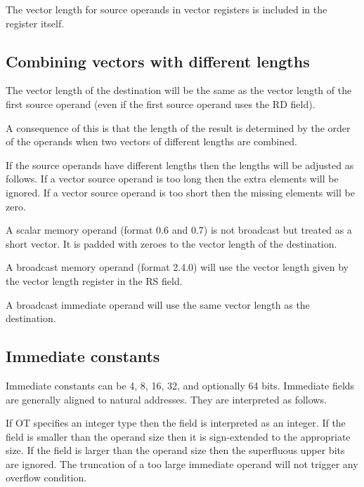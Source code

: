 \documentclass[forwardcom.tex]{subfiles}
\begin{document}
The vector length for source operands in vector registers is included in the register itself.

\subsection{Combining vectors with different lengths}
The vector length of the destination will be the same as the vector length of the first source operand (even if the first source operand uses the RD field).
\vspace{2mm}

A consequence of this is that the length of the result is determined by the order of the operands when two vectors of different lengths are combined.
\vspace{2mm}

If the source operands have different lengths then the lengths will be adjusted as follows. If a vector source operand is too long then the extra elements will be ignored. If a vector source operand is too short then the missing elements will be zero.
\vspace{2mm}

A scalar memory operand (format 0.6 and 0.7) is not broadcast but treated as a short vector. It is padded with zeroes to the vector length of the destination.
\vspace{2mm}

A broadcast memory operand (format 2.4.0) will use the vector length given by the vector length register in the RS field.
\vspace{2mm}

A broadcast immediate operand will use the same vector length as the destination.

\subsection{Immediate constants}
Immediate constants can be 4, 8, 16, 32, and optionally 64 bits. Immediate fields are generally aligned to natural addresses. They are interpreted as follows.
\vspace{2mm}

If OT specifies an integer type then the field is interpreted as an integer. If the field is smaller than the operand size then it is sign-extended to the appropriate size. If the field is larger than the operand size then the superfluous upper bits are ignored. The truncation of a too large immediate operand will not trigger any overflow condition.
\vspace{2mm}
\end{document}
